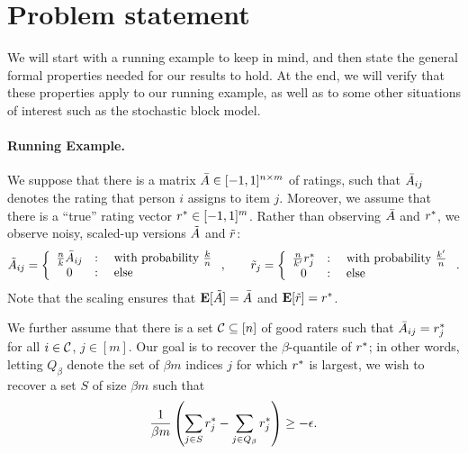 \section{Problem statement}

We will start with a running example to keep in mind, and 
then state the general formal properties needed for our 
results to hold. At the end, we will verify that these properties 
apply to our running example, as well as to some other situations 
of interest such as the stochastic block model.

\paragraph{Running Example.}
We suppose that there is a matrix 
$\bar{A} \in [-1,1]^{n \times m}$ of ratings, such that $\bar{A}_{ij}$ 
denotes the rating that person $i$ assigns to item $j$. 
Moreover, we assume that there is a ``true'' rating vector $r^* \in [-1,1]^m$.
Rather than observing $\bar{A}$ and $r^*$, we observe noisy, scaled-up 
versions $\tilde{A}$ and $\tilde{r}$:
\[ \tilde{A}_{ij} = \left\{ \begin{array}{ccl} \frac{n}{k}\bar{A}_{ij} & : & \text{ with probability $\frac{k}{n}$} \\ 0 & : & \text{ else} \end{array} \right., \quad\quad 
  \tilde{r}_j = \left\{ \begin{array}{ccl} \frac{n}{k'}r^*_j & : & \text{ with probability $\frac{k'}{n}$} \\ 0 & : & \text{ else} \end{array} \right.. \] %
Note that the scaling ensures that $\mathbf{E}[\tilde{A}] = \bar{A}$ and $\mathbf{E}[\tilde{r}] = r^*$. 

We further assume that there is a set $\mathcal{C} \subseteq [n]$ of good raters such 
that $\bar{A}_{ij} = r^*_j$ for all $i \in \mathcal{C}$, $j \in [m]$. Our goal is to 
recover the $\beta$-quantile of $r^*$; in other words, letting $Q_{\beta}$ 
denote the set of $\beta m$ indices $j$ for which $r^*$ is largest, we 
wish to recover a set $S$ of size $\beta m$ such that
\[ \frac{1}{\beta m}\left( \sum_{j \in S} r^*_j - \sum_{j \in Q_{\beta}} r^*_j \right) \geq - \epsilon. \]


